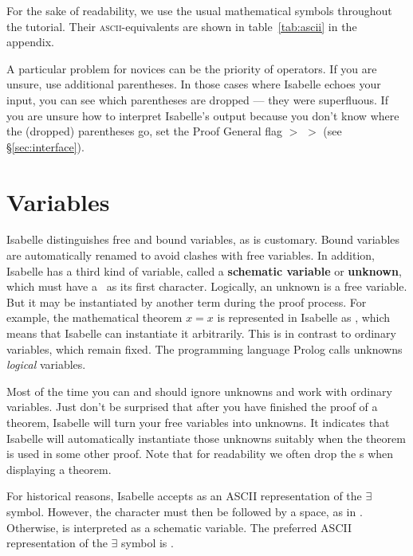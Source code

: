 For the sake of readability, we use the usual mathematical symbols throughout
the tutorial. Their \textsc{ascii}-equivalents are shown in table~\ref{tab:ascii} in
the appendix.

\begin{warn}
A particular problem for novices can be the priority of operators. If
you are unsure, use additional parentheses. In those cases where
Isabelle echoes your input, you can see which parentheses are dropped
--- they were superfluous. If you are unsure how to interpret
Isabelle's output because you don't know where the (dropped)
parentheses go, set the Proof General flag  $>$
 $>$  (see \S\ref{sec:interface}).
\end{warn}


\section{Variables}
\label{sec:variables}

Isabelle distinguishes free and bound variables, as is customary. Bound
variables are automatically renamed to avoid clashes with free variables. In
addition, Isabelle has a third kind of variable, called a \textbf{schematic
  variable} or \textbf{unknown}, 
which must have a~ as its first character.  
Logically, an unknown is a free variable. But it may be
instantiated by another term during the proof process. For example, the
mathematical theorem $x = x$ is represented in Isabelle as ,
which means that Isabelle can instantiate it arbitrarily. This is in contrast
to ordinary variables, which remain fixed. The programming language Prolog
calls unknowns {\em logical\/} variables.

Most of the time you can and should ignore unknowns and work with ordinary
variables. Just don't be surprised that after you have finished the proof of
a theorem, Isabelle will turn your free variables into unknowns.  It
indicates that Isabelle will automatically instantiate those unknowns
suitably when the theorem is used in some other proof.
Note that for readability we often drop the s when displaying a theorem.
\begin{warn}
  For historical reasons, Isabelle accepts  as an ASCII representation
  of the \(\exists\) symbol.  However, the  character must then be followed
  by a space, as in .  Otherwise,  is
  interpreted as a schematic variable.  The preferred ASCII representation of
  the \(\exists\) symbol is \@. 
\end{warn}%

